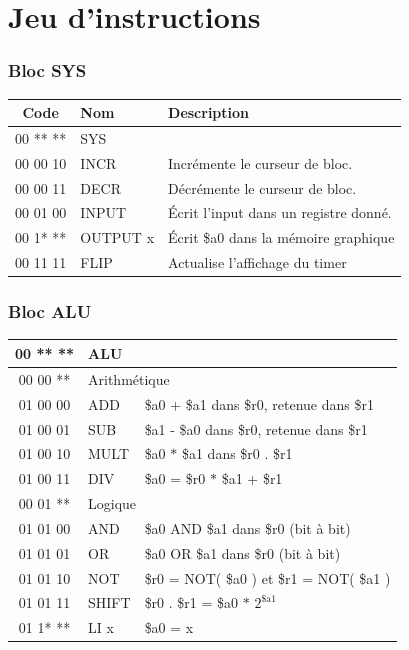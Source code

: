 \documentclass{beamer}
\begin{document}
\section{Jeu d'instructions}
\begin{frame}
\frametitle{Bloc SYS}
\begin{tabular}{|c|l|l|}
  \hline
  Code & Nom & Description \\
  \hline

  \hline
  00 ** ** & \multicolumn{2}{|l|}{SYS} \\
  \hline
  00 00 10 & INCR    & Incrémente le curseur de bloc. \\
  00 00 11 & DECR    & Décrémente le curseur de bloc. \\
  \hline\hline
  00 01 00 & INPUT    & \'Ecrit l'input dans un registre donné. \\
  00 1* ** & OUTPUT x & \'Ecrit \$a0 dans la mémoire graphique\\
  00 11 11 & FLIP     & Actualise l'affichage du timer \\
\end{tabular}
\end{frame}


\begin{frame}
\frametitle{Bloc ALU}
\begin{tabular}{|c|l|l|}
  \hline
  00 ** ** & \multicolumn{2}{|l|}{ALU} \\
	  \hline
  00 00 ** & \multicolumn{2}{|l|}{Arithmétique} \\
  \hline
  01 00 00 & ADD   & \$a0 + \$a1 dans \$r0, retenue dans \$r1 \\
  01 00 01 & SUB   & \$a1 - \$a0 dans \$r0, retenue dans \$r1 \\
  01 00 10 & MULT  & \$a0 $*$ \$a1 dans \$r0 . \$r1\\
  01 00 11 & DIV   & \$a0 = \$r0 $*$ \$a1 + \$r1 \\
  \hline
  00 01 ** & \multicolumn{2}{|l|}{Logique} \\
  \hline
  01 01 00 & AND   & \$a0 AND \$a1 dans \$r0 (bit à bit) \\
  01 01 01 & OR    & \$a0 OR \$a1 dans \$r0 (bit à bit) \\
  01 01 10 & NOT   & \$r0 = NOT( \$a0 ) et \$r1 = NOT( \$a1 ) \\
  01 01 11 & SHIFT & \$r0 . \$r1 = \$a0 $*$ $2^{\text{\$a1}}$ \\
  \hline
  01 1* ** & LI x  & \$a0 = x \\
	\end{tabular}
	\end{frame}
\end{document}
